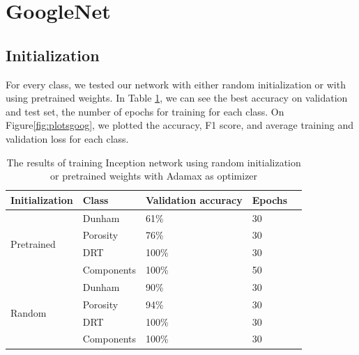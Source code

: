 

\section{GoogleNet}\label{sec:gogl}
\subsection{Initialization}
For every class, we tested our network with either random initialization or with using pretrained weights. In Table \ref{tab:googinit}, we can see the best accuracy on validation and test set, the number of epochs for training for each class.  
On Figure\ref{fig:plotsgoog}, we plotted the accuracy, F1 score, and average training and validation loss for each class. 

\begin{table}
\caption{\label{tab:googinit} The results of training Inception network using random initialization or pretrained weights with Adamax as optimizer}
\centering
\begin{tabular}[b]{| l | l | l | l | l |}
\hline
    Initialization & Class & Validation accuracy  & Epochs\\ \hline
    \multirow{4}{*}{Pretrained} & Dunham &  61\%  & 30 \\ %
    & Porosity & 76\% &  30 \\
    &DRT & 100\% &  30 \\
    &Components & 100\% &  50 \\ \hline
     \multirow{4}{*}{Random} & Dunham &  90\% & 30 \\
    & Porosity & 94\% &  30 \\
    &DRT & 100\% &  30 \\
    &Components & 100\% & 30 \\ \hline
\end{tabular} 
\end{table}

